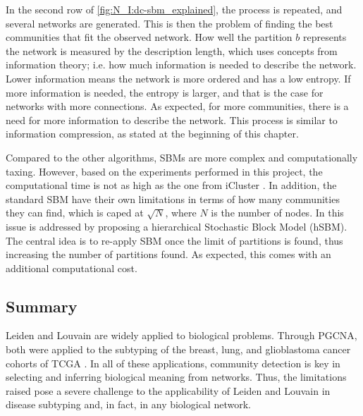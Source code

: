 In the second row of \cref{fig:N_I:dc-sbm_explained}, the process is repeated, and several networks are generated. This is then the problem of finding the best communities that fit the observed network. How well the partition $b$ represents the network is measured by the description length, which uses concepts from information theory; i.e. how much information is needed to describe the network. Lower information means the network is more ordered and has a low entropy. If more information is needed, the entropy is larger, and that is the case for networks with more connections. As expected, for more communities, there is a need for more information to describe the network. This process is similar to information compression, as stated at the beginning of this chapter.

Compared to the other algorithms, SBMs are more complex and computationally taxing. However, based on the experiments performed in this project, the computational time is not as high as the one from iCluster \citep{Mo2013-zi}. In addition, the standard SBM \citep{Peixoto2019-fg, Peixoto2017-gc, Peixoto2018-ot, Karrer2011-si} have their own limitations in terms of how many communities they can find, which is caped at $\sqrt{N}$, where $N$ is the number of nodes. In \citet{Peixoto2014-yb} this issue is addressed by proposing a hierarchical Stochastic Block Model (hSBM). The central idea is to re-apply SBM once the limit of partitions is found, thus increasing the number of partitions found. As expected, this comes with an additional computational cost.

\subsection{Summary}


Leiden and Louvain are widely applied to biological problems. Through PGCNA, both were applied to the subtyping of the breast, lung, and glioblastoma cancer cohorts of TCGA \citep{Tanner2023-wa, Care2019-ij}. In all of these applications, community detection is key in selecting and inferring biological meaning from networks. Thus, the limitations raised \citep{Peixoto2023-se,Guimera2004-gv, Peixoto2023-rt} pose a severe challenge to the applicability of Leiden and Louvain in disease subtyping and, in fact, in any biological network. 

